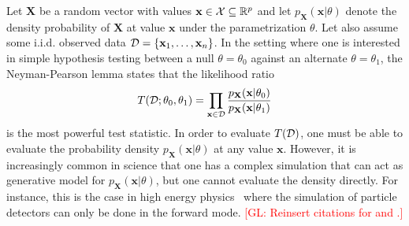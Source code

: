 \documentclass[12pt]{article}
\numberwithin{equation}{section}
\theoremstyle{plain}
\newcommand{\glnote}[1]{\textcolor{red}{[GL: #1]}}
\begin{document}
Let $\mathbf{X}$ be a random vector with values $\mathbf{x} \in {\cal X}
\subseteq \mathbb{R}^p$ and let $p_\mathbf{X}(\mathbf{x}|\theta)$ denote the
density probability of $\mathbf{X}$ at value $\mathbf{x}$ under the
parametrization $\theta$. Let also assume some i.i.d. observed data ${\cal D} = \{
\mathbf{x}_1, \dots, \mathbf{x}_n \}$. In the setting where one is interested in
simple hypothesis testing between a null $\theta=\theta_0$ against an alternate
$\theta=\theta_1$, the Neyman-Pearson lemma states that the likelihood ratio
\begin{equation}\label{eqn:likelihood-ratio-test}
T({\cal D}; \theta_0, \theta_1) = \prod_{\mathbf{x} \in {\cal D}} \frac{ p_\mathbf{X}(\mathbf{x}|\theta_0)}{ p_\mathbf{X}(\mathbf{x}|\theta_1)}
\end{equation}
is the most powerful test statistic. In order to evaluate $T({\cal D})$, one
must be able to evaluate the probability density $p_\mathbf{X}(\mathbf{x}|
\theta)$ at any value $\mathbf{x}$. However, it is increasingly common in
science that one has a complex simulation that can act as generative model for
$p_\mathbf{X}(\mathbf{x}|\theta)$, but one cannot evaluate the density directly.
For instance, this is the case in high energy physics~\citep{Neal:2007zz} where
the simulation of particle detectors can only be done in the forward mode.
\glnote{Reinsert citations for \cite{ClaytonScott} and \cite{JMLR:v14:tong13a}.}

%
\end{document}
